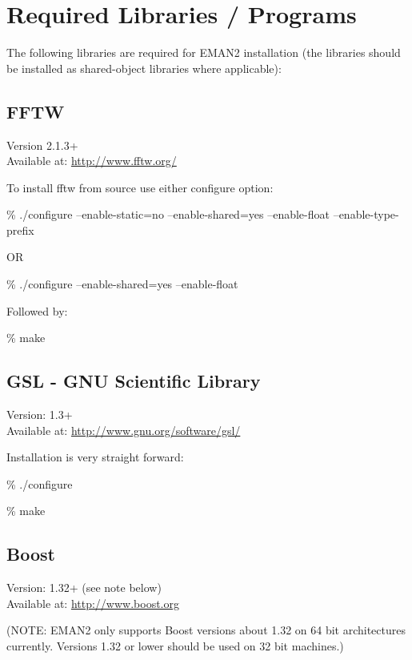 %

\section{Required Libraries / Programs}
\label{REQUIRED-LIBRARIESS} 
The following libraries are required for EMAN2 installation (the
libraries should be installed as shared-object libraries where applicable):

\subsection{FFTW} 
  Version 2.1.3+\\
  Available at: \href{http://www.fftw.org/}{http://www.fftw.org/} 
    

   To install fftw from source use either configure option:
   
   \% ./configure --enable-static=no --enable-shared=yes --enable-float --enable-type-prefix

   OR

   \% ./configure --enable-shared=yes --enable-float 
   
   
   Followed by:
   
   \% make

\subsection{GSL - GNU Scientific Library} 
  Version: 1.3+\\
  Available at: \href{http://www.gnu.org/software/gsl/}{http://www.gnu.org/software/gsl/} 
   
  Installation is very straight forward:

   \% ./configure
   
   \% make
   
\subsection{Boost}
  Version: 1.32+ (see note below)\\
  Available at: \href{http://www.boost.org}{http://www.boost.org}
   
       
  
  (NOTE:  EMAN2 only supports Boost versions about 1.32 on 64 bit
  architectures currently.  Versions 1.32 or lower should be used on
  32 bit machines.)  

